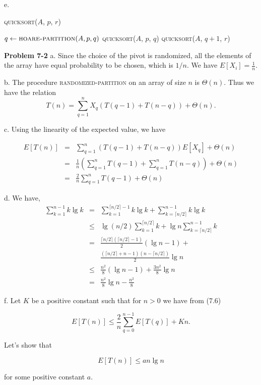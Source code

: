 \documentclass[a4paper,12pt]{article}
\newcommand{\newprob}[1]
{\bigskip \noindent \textbf{Problem #1} \newline}
\newcommand{\subpar}[1]{\medskip \noindent #1.}
\newcommand{\la}{\leftarrow}
\begin{document}
\subpar{e}

\noindent
\textsc{quicksort}($A$, $p$, $r$)
\begin{algorithmic}
  \STATE $q \la \textsc{hoare-partition}(A, p, q)$
  \STATE \textsc{quicksort}($A$, $p$, $q$)
  \STATE \textsc{quicksort}($A$, $q+1$, $r$)
  \ENDIF
\end{algorithmic}
\newprob{7-2}
\subpar{a} Since the choice of the pivot is randomized, all the
elements of the array have equal probability to be chosen, which is
$1/n$.  We have $E[X_i] = \frac{1}{n}$.

\subpar{b}
The procedure \textsc{randomized-partition} on an array of size $n$ is
$\Theta(n)$.  Thus we have the relation
\[ T(n) = \sum_{q=1}^n X_q(T(q-1) + T(n-q)) + \Theta(n).\]

\subpar{c}
Using the linearity of the expected value, we have

\begin{eqnarray*}
  E[T(n)] &=& \sum_{q=1}^n(T(q-1) + T(n-q)) E[X_q] + \Theta(n) \\
  &=& \frac{1}{n}\left(\sum_{q=1}^n T(q-1) + \sum_{q=1}^nT(n-q)\right)
  + \Theta(n) \\
  &=& \frac{2}{n} \sum_{q=1}^n T(q-1) + \Theta(n)
\end{eqnarray*}

\subpar{d}
We have,
\begin{eqnarray*}
  \sum_{k=1}^{n-1} k \lg k &=& \sum_{k=1}^{\lceil n/2\rceil - 1} k \lg
  k + \sum_{k = \lceil n/2\rceil}^{n-1} k \lg k \\ &\le& \lg(n/2)
  \sum_{k=1}^{\lceil n/2\rceil} k + \lg n \sum_{k=\lceil
    n/2\rceil}^{n-1} k \\ &=& \frac{\lceil n/2\rceil (\lceil n/2\rceil
    - 1)}{2}(\lg n - 1) + \\ && \frac{(\lceil n/2\rceil + n - 1)(n -
    \lceil n/2\rceil)}{2} \lg n \\ &\le&
  \frac{n^2}{8}(\lg n - 1) + \frac{3n^2}{8} \lg n \\ &=&
  \frac{n^2}{8} \lg n - \frac{n^2}{8}
\end{eqnarray*}

\subpar{f}
Let $K$ be a positive constant such that for $n > 0$ we have from
(7.6)

\[ E[T(n)] \le \frac{2}{n} \sum_{q=0}^{n-1}E[T(q)] + Kn .\]

Let's show that

\[ E[T(n)] \le a n \lg n\]

for some positive constant $a$.
\end{document}
